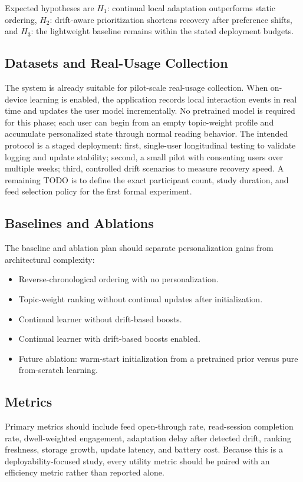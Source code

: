 \documentclass[11pt]{article}
\begin{document}
Expected hypotheses are $H_1$: continual local adaptation outperforms static ordering, $H_2$: drift-aware prioritization shortens recovery after preference shifts, and $H_3$: the lightweight baseline remains within the stated deployment budgets.

\subsection{Datasets and Real-Usage Collection}
The system is already suitable for pilot-scale real-usage collection. When on-device learning is enabled, the application records local interaction events in real time and updates the user model incrementally. No pretrained model is required for this phase; each user can begin from an empty topic-weight profile and accumulate personalized state through normal reading behavior. The intended protocol is a staged deployment: first, single-user longitudinal testing to validate logging and update stability; second, a small pilot with consenting users over multiple weeks; third, controlled drift scenarios to measure recovery speed. A remaining TODO is to define the exact participant count, study duration, and feed selection policy for the first formal experiment.

\subsection{Baselines and Ablations}
The baseline and ablation plan should separate personalization gains from architectural complexity:

\begin{itemize}[leftmargin=*]
\item Reverse-chronological ordering with no personalization.
\item Topic-weight ranking without continual updates after initialization.
\item Continual learner without drift-based boosts.
\item Continual learner with drift-based boosts enabled.
\item Future ablation: warm-start initialization from a pretrained prior versus pure from-scratch learning.
\end{itemize}

\subsection{Metrics}
Primary metrics should include feed open-through rate, read-session completion rate, dwell-weighted engagement, adaptation delay after detected drift, ranking freshness, storage growth, update latency, and battery cost. Because this is a deployability-focused study, every utility metric should be paired with an efficiency metric rather than reported alone.
\end{document}
